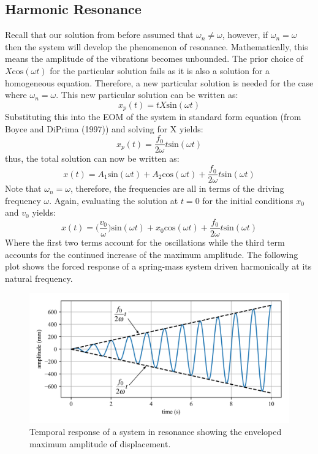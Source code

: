 \documentclass[12pt,letter]{article}
\begin{document}
	
\subsection{Harmonic Resonance}			
	
	Recall that our solution from before assumed that $\omega_n \neq \omega$, however, if $\omega_n = \omega$ then the system will develop the phenomenon of resonance. Mathematically, this means the amplitude of the vibrations becomes unbounded. The prior choice of $X\text{cos}(\omega t)$ for the particular solution fails as it is also a solution for a homogeneous equation. Therefore, a new particular solution is needed for the case where $\omega_n = \omega$. This new particular solution can be written as:
	\begin{equation}
		x_p(t) = t X\text{sin}(\omega t)
	\end{equation}				
	Substituting this into the EOM of the system in standard form equation (from Boyce and DiPrima (1997)) and solving for X yields:
	\begin{equation}
		x_p(t) = \frac{f_0}{2 \omega} t \text{sin}(\omega t)
	\end{equation}	
	thus, the total solution can now be written as:
	\begin{equation}
		x(t) = A_1\text{sin}(\omega t) + A_2\text{cos}(\omega t) + \frac{f_0}{2 \omega} t \text{sin}(\omega t)
	\end{equation}			
	Note that $\omega_n=\omega$, therefore, the frequencies are all in terms of the driving frequency $\omega$. Again, evaluating the solution at $t=0$ for the initial conditions $x_0$ and $v_0$ yields:
	\begin{equation}
		x(t) = \Big(\frac{v_0}{\omega}\Big)\text{sin}(\omega t) + x_0\text{cos}(\omega t) + \frac{f_0}{2 \omega} t \text{sin}(\omega t)
	\end{equation}			
	Where the first two terms account for the oscillations while the third term accounts for the continued increase of the maximum amplitude. The following plot shows the forced response of a spring-mass system driven harmonically at its natural frequency.
	\begin{figure}[H]
		\centering
		\includegraphics[]{../figures/resonance.png}
		\caption{Temporal response of a system in resonance showing the enveloped maximum amplitude of displacement.}
	\end{figure}				
\end{document}
